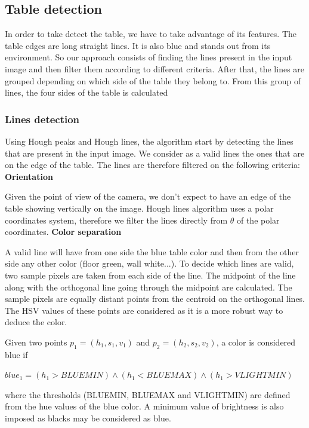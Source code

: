 \documentclass[a4paper]{article}
\begin{document}
\subsection{Table detection}

In order to take detect the table, we have to take advantage of its features. The table edges are long straight lines. It is also blue and stands out from its environment. So our approach consists of finding the lines present in the input image and then filter them according to different criteria. After that, the lines are grouped depending on which side of the table they belong to. From this group of lines, the four sides of the table is calculated

\subsubsection{Lines detection}

Using Hough peaks and Hough lines, the algorithm start by detecting the lines that are present in the input image. We consider as a valid lines the ones that are on the edge of the table. The lines are therefore filtered on the following criteria:
\bigbreak
\textbf{Orientation}

Given the point of view of the camera, we don't expect to have an edge of the table showing vertically on the image. Hough lines algorithm uses a polar coordinates system, therefore we filter the lines directly from $\theta$ of the polar coordinates.
\bigbreak
\textbf{Color separation}

A valid line will have from one side the blue table color and then from the other side any other color (floor green, wall white...). To decide which lines are valid, two sample pixels are taken from each side of the line. The midpoint of the line along with the orthogonal line going through the midpoint are calculated. The sample pixels are equally distant points from the centroid on the orthogonal lines. The HSV values of these points are considered as it is a more robust way to deduce the color.

Given two points $p_{1} = (h_{1}, s_{1}, v_{1})$ and $p_{2} = (h_{2}, s_{2}, v_{2})$, a color is considered blue if

$blue_{1} = (h_{1} > BLUEMIN) \wedge (h_{1} < BLUEMAX) \wedge (h_{1} > VLIGHTMIN)$

where the thresholds (BLUEMIN, BLUEMAX and VLIGHTMIN) are defined from the hue values of the blue color. A minimum value of brightness is also imposed as blacks may be considered as blue.
\end{document}
